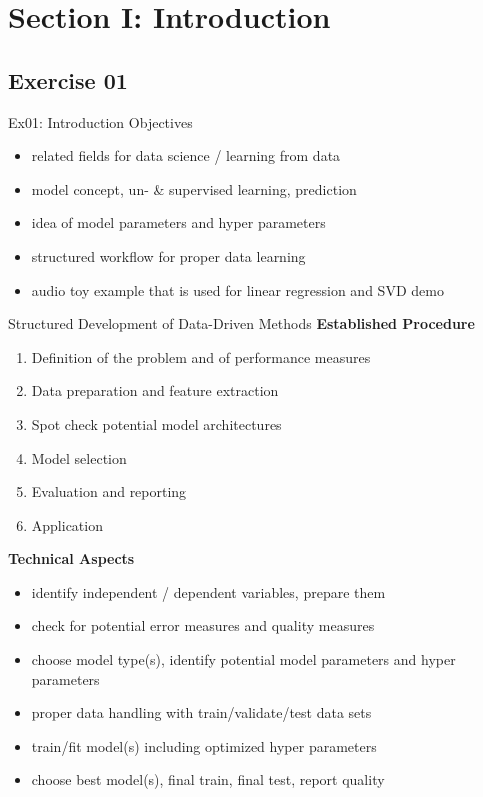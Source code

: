 \documentclass[mathserif, aspectratio=1610]{intbeamer}
\begin{document}
\section{Section I: Introduction}

\subsection{Exercise 01}
\begin{frame}{Ex01: Introduction}
Objectives
\begin{itemize}
\item related fields for data science / learning from data
\item model concept, un- \& supervised learning, prediction
\item idea of model parameters and hyper parameters
\item structured workflow for proper data learning
\item audio toy example that is used for linear regression and SVD demo
\end{itemize}
\end{frame}

\begin{frame}{Structured Development of Data-Driven Methods}
\textbf{Established Procedure}
\begin{enumerate}
\item Definition of the problem and of performance measures
\item Data preparation and feature extraction
\item Spot check potential model architectures
\item Model selection
\item Evaluation and reporting
\item Application
\end{enumerate}
\textbf{Technical Aspects}
\begin{itemize}
\item identify independent / dependent variables, prepare them
\item check for potential error measures and quality measures
\item choose model type(s), identify potential model parameters and hyper parameters
\item proper data handling with train/validate/test data sets
\item train/fit model(s) including optimized hyper parameters
\item choose best model(s), final train, final test, report quality
\end{itemize}
\end{frame}
\end{document}
